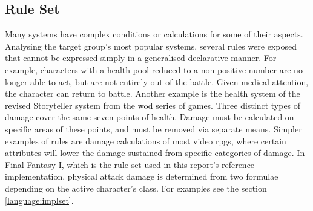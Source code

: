 \subsection{\langname{} Rule Set}
\label{language:ruleset}
Many systems have complex conditions or calculations for some of their aspects.
Analysing the target group's most popular systems, several rules were exposed that cannot be expressed simply in a generalised declarative manner.
For example, characters with a health pool reduced to a non-positive number are no longer able to act, but are not entirely out of the battle.
Given medical attention, the character can return to battle.
Another example is the health system of the revised Storyteller system from the \ac{wod} series of games. Three distinct types of damage cover the same seven points of health. Damage must be calculated on specific areas of these points, and must be removed via separate means.
Simpler examples of rules are damage calculations of most video \ac{rpgs},
where certain attributes will lower the damage sustained from specific categories of damage. In Final Fantasy I, which is the rule set used in this report's reference implementation, physical attack damage is determined from two formulae depending on the active character's class. For examples see the section \vref{language:implset}.

